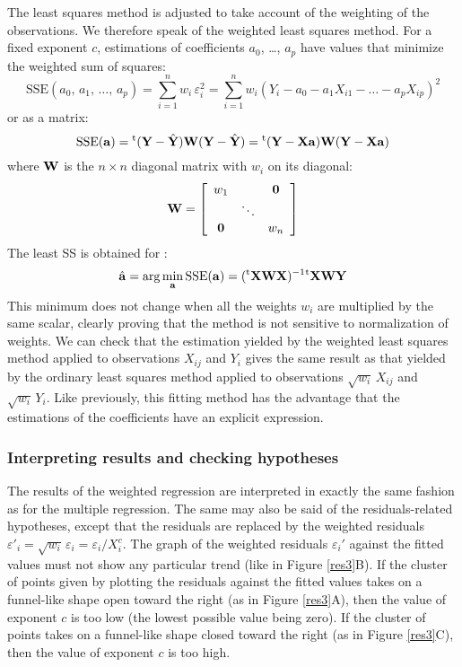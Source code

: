 The least squares method is adjusted to take account of the weighting of the observations. We therefore speak of the weighted least squares method. For a fixed exponent $c$, estimations of coefficients $a_0$, \ldots, $a_p$ have values that minimize the weighted sum of squares:
\[
\mathrm{SSE}(a_0,\,a_1,\,\ldots,\,a_p)=\sum_{i=1}^nw_i\,\varepsilon_i^2
=\sum_{i=1}^nw_i(Y_i-a_0-a_1X_{i1}-\ldots-a_pX_{ip})^2
\]
or as a matrix:
\[
\mathrm{SSE}(\mathbf{a})={}^{\mathrm{t}}(\mathbf{Y}-\hat{\mathbf{Y}})\mathbf{W}
(\mathbf{Y}-\hat{\mathbf{Y}})={}^{\mathrm{t}}(\mathbf{Y}-\mathbf{X}\mathbf{a})
\mathbf{W} (\mathbf{Y}-\mathbf{X}\mathbf{a})
\]
where $\mathbf{W}$ is the $n\times n$ diagonal matrix with $w_i$ on its diagonal:
\[
\matx{W}=\left[
\begin{array}{ccc}
w_1 && \mathbf{0}\\ %
& \ddots & \\ %
\mathbf{0} && w_n
\end{array}
\right]
\]
The least SS is obtained for \citep{magnus07}:
\[
\hat{\mathbf{a}}=\arg\min_{\mathbf{a}}\mathrm{SSE}(\mathbf{a})
=({}^{\mathrm{t}}\mathbf{X}\mathbf{W}\mathbf{X})^{-1}{}^{\mathrm{t}}\mathbf{X}\mathbf{W}\mathbf{Y}
\]
This minimum does not change when all the weights $w_i$ are multiplied by the same scalar, clearly proving that the method is not sensitive to normalization of weights. We can check that the estimation yielded by the weighted least squares method applied to observations $X_{ij}$ and $Y_i$ gives the same result as that yielded by the ordinary least squares method applied to observations $\sqrt{w_i}\,X_{ij}$ and $\sqrt{w_i}\,Y_i$. Like previously, this fitting method has the advantage that the estimations of the coefficients have an explicit expression.

\subsubsection{Interpreting results and checking hypotheses}

The results of the weighted regression are interpreted in exactly the same fashion as for the multiple regression. The same may also be said of the residuals-related hypotheses, except that the residuals are replaced by the weighted residuals
$\varepsilon'_i=\sqrt{w_i}\,\varepsilon_i=\varepsilon_i/X_i^c$. 
The graph of the weighted residuals $\varepsilon_i'$ against the fitted values must not show any particular trend (like in
 Figure \ref{res3}B). If the cluster of points given by plotting the residuals against the fitted values takes on a funnel-like shape open toward the right (as in  Figure \ref{res3}A), then the value of exponent $c$ is too low (the lowest possible value being zero). If the cluster of points takes on a funnel-like shape closed toward the right (as in  Figure \ref{res3}C), then the value of exponent $c$ is too high.

